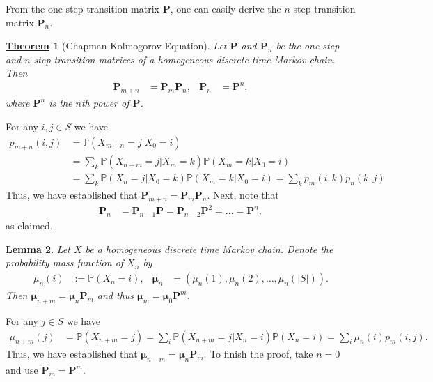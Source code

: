 \documentclass[12pt]{book}
\numberwithin{equation}{chapter}
\theoremstyle{plain}
\newtheorem{theorem}{\underline{Theorem}}
\numberwithin{theorem}{section}
\newtheorem{lemma}[theorem]{\underline{Lemma}}   		%
\theoremstyle{definition}
\numberwithin{exercise}{chapter}
\let\oldendproof\endproof
\renewenvironment{proof}[1][\proofname]{%
  \oldproof[\scshape\underline{#1}]%
}{\oldendproof}
\newcommand{\<}{\langle}
\renewcommand{\>}{\rangle}
\renewcommand{\(}{\left(}
\renewcommand{\)}{\right)}
\renewcommand{\[}{\left[}
\renewcommand{\]}{\right]}
\newcommand\Pb{\mathds{P}}
\newcommand\Pv{\pmb{P}}
\newcommand\muv{\pmb{\mu}}
\begin{document}
\noindent
From the one-step transition matrix $\Pv$, one can easily derive the $n$-step transition matrix $\Pv_n$.

\begin{theorem}[Chapman-Kolmogorov Equation]
\label{thm:chapman-kolmogorov}
Let $\Pv$ and $\Pv_n$ be the one-step and $n$-step transition matrices of a homogeneous discrete-time Markov chain.  Then
\begin{align}
\Pv_{m+n} 
	&= \Pv_m\Pv_n , &
\Pv_n
	&=	\Pv^n ,
\end{align}
where $\Pv^n$ is the $n$th power of $\Pv$.
\end{theorem}
\begin{proof}
For any $i,j \in S$ we have
\begin{align}
p_{m+n}(i,j)
	&=	\Pb( X_{m+n} = j | X_0 = i) \\
	&=	\sum_{k} \Pb( X_{n+m} = j | X_m = k) \Pb( X_{m} = k | X_0 = i) \\
	&=	\sum_{k} \Pb( X_{n} = j | X_0 = k) \Pb( X_{m} = k | X_0 = i)	
	=		\sum_{k} p_m(i,k) p_n(k,j) 
\end{align}
Thus, we have established that $\Pv_{m+n} = \Pv_m\Pv_n$.  Next, note that
\begin{align}
\Pv_n
	&=	\Pv_{n-1}\Pv
	=		\Pv_{n-2} \Pv^2
	=		\ldots
	=		\Pv^n ,
\end{align}
as claimed.
\end{proof}

\begin{lemma}
Let $X$ be a homogeneous discrete time Markov chain.
Denote the probability mass function of $X_n$ by
\begin{align}
\mu_n(i)
	&:=	\Pb( X_n = i ) , &
\muv_n
	&=	( \mu_n(1), \mu_n(2), \ldots , \mu_n(|S|) ) .
\end{align}
Then $\muv_{n+m} = \muv_{n} \Pv_m$ and thus $\muv_m = \muv_0 \Pv^m$.
\end{lemma}
\begin{proof}
For any $j \in S$ we have
\begin{align}
\mu_{n+m}(j)
	&=	\Pb( X_{n+m} = j ) 
	=		\sum_i \Pb(X_{n+m} = j | X_n = i) \Pb(X_n = i)
	=		\sum_i \mu_n(i) p_m(i,j) .
\end{align}
Thus, we have established that $\muv_{n+m} = \muv_{n} \Pv_m$.  To finish the proof, take $n=0$ and use $\Pv_m = \Pv^m$.
\end{proof}
\end{document}
